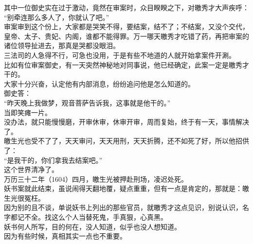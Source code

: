 \begin{multicols}{\theparacolNo}
其中一位御史实在过于激动，竟然在审案时，众目睽睽之下，对皦秀才大声疾呼：\\

“别牵连那么多人了，你就认了吧。”\\

审案审到这个份上，大家都是哭笑不得，要结案，结不了；不结案，又没个交代，皇帝、太子、贵妃、内阁，谁都不能得罪。万一哪天皦秀才吃错了药，再把审案的诸位领导扯进去，那真是哭都没眼泪。\\

三法司的人急得不行，可急也没用，于是有些不地道的人就开始拿案件开涮。\\

比如有位审案御史，有一天突然神秘地对同事说，他已经确定，此案一定是皦秀才干的。\\

大家十分兴奋，认定他有内部消息，纷纷追问他是怎么知道的。\\

御史答：\\

“昨天晚上我做梦，观音菩萨告诉我，这事就是他干的。”\\

当即笑瘫一片。\\

没办法，就只能慢慢磨，开审休审，休审开审，周而复始，终于有一天，事情解决了。\\

皦生光也受不了了，天天审问，天天用刑，天天折腾，还不如死了好，所以他招供了：\\

“是我干的，你们拿我去结案吧。”\\

这个世界清净了。\\

万历三十二年（1604）四月，皦生光被押赴刑场，凌迟处死。\\

妖书案就此结束，虽说闹得天翻地覆，疑点重重，但有一点是肯定的，那就是：皦生光很冤枉。\\

因为别的且不谈，单说妖书上列出的那些官员，就皦秀才这点见识，别说认识，名字都记不全。找这么个人当替死鬼，手真狠，心真黑。\\

妖书何人所写，目的何在，没人知道，似乎也没人想知道。\\

因为有些时候，真相其实一点也不重要。\\


\end{multicols}
